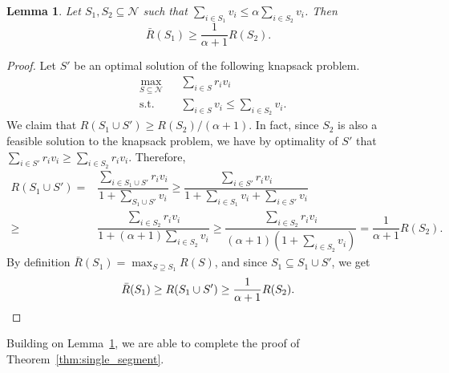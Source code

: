 \documentclass[msom,non-blindrev]{informs3} %
\newtheorem{lemma}[theorem]{Lemma}
\theoremstyle{definition}
\begin{document}
\begin{lemma}\label{lemma:optimal_expansion}
    Let $S_1,S_2\subseteq\mathcal{N}$ such that $\sum_{i\in S_1}v_i\leq \alpha\sum_{i\in S_2}v_i$. Then
	\begin{equation*}
		\bar{R}(S_1)\geq \dfrac{1}{\alpha+1}R(S_2).
	\end{equation*}
\end{lemma}
\begin{proof}
	Let $S'$ be an optimal solution of the following knapsack problem.
	\begin{equation*}
        \begin{aligned}
		&\max_{S\subseteq\mathcal{N}} &&{\sum_{i\in S}r_iv_i}\\
		&\text{s.t.}&&{\sum_{i\in S}v_i\leq \sum_{i\in S_2}v_i.}
        \end{aligned}
	\end{equation*}
We claim that $R(S_1\cup S')\geq R(S_2)/(\alpha+1)$. In fact, since $S_2$ is also a feasible solution to the knapsack problem, we have by optimality of $S'$ that $\sum_{i\in S'}r_iv_i\geq \sum_{i\in S_2}r_iv_i$. Therefore,
	\begin{align*}
		R(S_1\cup S')=&\dfrac{\sum_{i\in S_1\cup S'}r_iv_i}{1+\sum_{S_1\cup S'}v_i}\geq\dfrac{\sum_{i\in S'}r_iv_i}{1+\sum_{i\in S_1}v_i+\sum_{i\in S'}v_i}\\\geq&\dfrac{\sum_{i\in S_2}r_iv_i}{1+(\alpha+1)\sum_{i\in S_2}v_i}\geq\dfrac{\sum_{i\in S_2}r_iv_i}{(\alpha+1)(1+\sum_{i\in S_2}v_i)}=\dfrac{1}{\alpha+1}R(S_2).
	\end{align*}
	By definition $\bar{R}(S_1)=\max_{S\supseteq S_1}R(S)$, and since $S_1 \subseteq S_1 \cup S'$, we get
	\begin{equation*}
		\bar{R}(S_1)\geq R(S_1\cup S')\geq \dfrac{1}{\alpha+1}R(S_2).\qedhere
	\end{equation*}
\end{proof}

Building on  Lemma~\ref{lemma:optimal_expansion}, we are able to complete the proof of Theorem~\ref{thm:single_segment}.
\end{document}
